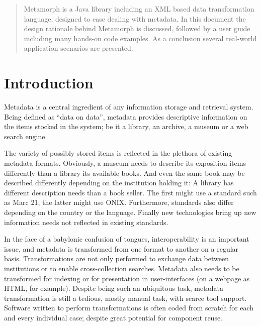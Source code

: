 \documentclass[12pt,a4paper]{article}
\begin{document}
\maketitle

\begin{abstract}
Metamorph is a Java library including an XML based data transformation language, designed to ease dealing with metadata. In this document the design rationale behind Metamorph is discussed, followed by a user guide including many hands-on code examples. As a conclusion several real-world application scenarios are presented.
\end{abstract}

\section{Introduction}
Metadata is a central ingredient of any information storage and retrieval system. Being defined as ``data on data'', metadata provides descriptive information on the items stocked in the system; be it a library, an archive, a museum or a web search engine.

The variety of possibly stored items is reflected in the plethora of existing metadata formats. Obviously, a museum needs to describe its exposition items differently than a library its available books. And even the same book may be described differently depending on the institution holding it: A library has different description needs than a book seller. The first might use a standard such as Marc 21, the latter might use ONIX. Furthermore, standards also differ depending on the country or the language. Finally new technologies bring up new information needs not reflected in existing standards. 

In the face of a babylonic confusion of tongues, interoperability is an important issue, and metadata is transformed from one format to another on a regular basis. Transformations are not only performed to exchange data between institutions or to enable cross-collection searches. Metadata also needs to be transformed for indexing or for presentation in user-interfaces (on a webpage as HTML, for example). Despite being such an ubiquitous task, metadata transformation is still a tedious, mostly manual task, with scarce tool support. Software written to perform transformations is often coded from scratch for each and every individual case; despite great potential for component reuse. 
\end{document}
